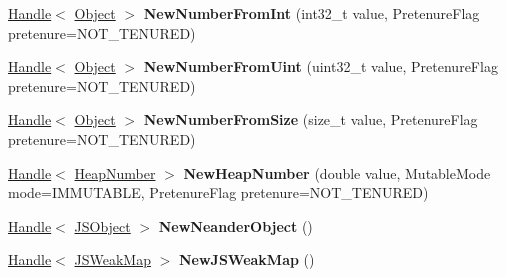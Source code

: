 \begin{DoxyCompactItemize}
\item 
\hyperlink{classv8_1_1internal_1_1_handle}{Handle}$<$ \hyperlink{classv8_1_1internal_1_1_object}{Object} $>$ {\bfseries New\+Number\+From\+Int} (int32\+\_\+t value, Pretenure\+Flag pretenure=N\+O\+T\+\_\+\+T\+E\+N\+U\+R\+ED)\hypertarget{classv8_1_1internal_1_1_factory_a868a8f99947cd1cc54b9b86719595ae7}{}\label{classv8_1_1internal_1_1_factory_a868a8f99947cd1cc54b9b86719595ae7}

\item 
\hyperlink{classv8_1_1internal_1_1_handle}{Handle}$<$ \hyperlink{classv8_1_1internal_1_1_object}{Object} $>$ {\bfseries New\+Number\+From\+Uint} (uint32\+\_\+t value, Pretenure\+Flag pretenure=N\+O\+T\+\_\+\+T\+E\+N\+U\+R\+ED)\hypertarget{classv8_1_1internal_1_1_factory_a0d298db79cbc1b6b56e3e37569dff5b5}{}\label{classv8_1_1internal_1_1_factory_a0d298db79cbc1b6b56e3e37569dff5b5}

\item 
\hyperlink{classv8_1_1internal_1_1_handle}{Handle}$<$ \hyperlink{classv8_1_1internal_1_1_object}{Object} $>$ {\bfseries New\+Number\+From\+Size} (size\+\_\+t value, Pretenure\+Flag pretenure=N\+O\+T\+\_\+\+T\+E\+N\+U\+R\+ED)\hypertarget{classv8_1_1internal_1_1_factory_a990d4b0715526adff9cba11a4220f6ff}{}\label{classv8_1_1internal_1_1_factory_a990d4b0715526adff9cba11a4220f6ff}

\item 
\hyperlink{classv8_1_1internal_1_1_handle}{Handle}$<$ \hyperlink{classv8_1_1internal_1_1_heap_number}{Heap\+Number} $>$ {\bfseries New\+Heap\+Number} (double value, Mutable\+Mode mode=I\+M\+M\+U\+T\+A\+B\+LE, Pretenure\+Flag pretenure=N\+O\+T\+\_\+\+T\+E\+N\+U\+R\+ED)\hypertarget{classv8_1_1internal_1_1_factory_aa69dc45c00a59cd9d062fc761ae9574e}{}\label{classv8_1_1internal_1_1_factory_aa69dc45c00a59cd9d062fc761ae9574e}

\item 
\hyperlink{classv8_1_1internal_1_1_handle}{Handle}$<$ \hyperlink{classv8_1_1internal_1_1_j_s_object}{J\+S\+Object} $>$ {\bfseries New\+Neander\+Object} ()\hypertarget{classv8_1_1internal_1_1_factory_a38e67766213737fa95ae03cabd9552b4}{}\label{classv8_1_1internal_1_1_factory_a38e67766213737fa95ae03cabd9552b4}

\item 
\hyperlink{classv8_1_1internal_1_1_handle}{Handle}$<$ \hyperlink{classv8_1_1internal_1_1_j_s_weak_map}{J\+S\+Weak\+Map} $>$ {\bfseries New\+J\+S\+Weak\+Map} ()\hypertarget{classv8_1_1internal_1_1_factory_a23a89e88ffc74afa093c7167f1e986a8}{}\label{classv8_1_1internal_1_1_factory_a23a89e88ffc74afa093c7167f1e986a8}


\end{DoxyCompactItemize}

